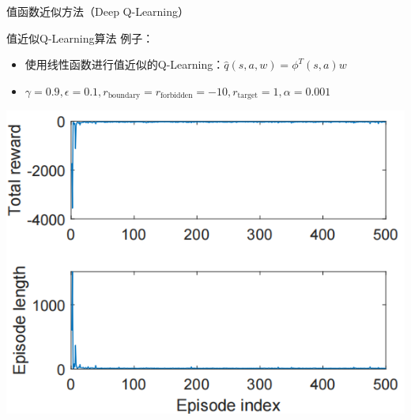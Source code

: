 \begin{section}{值函数近似方法\alert{（Deep Q-Learning）}}
\begin{frame}{值近似Q-Learning算法}
    例子：
    \begin{itemize}
        \item 使用\alert{线性函数}进行值近似的Q-Learning：$\hat{q}(s,a,w)=\phi^T(s,a)w$
        \item $\gamma=0.9,\epsilon=0.1,r_\text{boundary}=r_\text{forbidden}=-10, r_\text{target}=1,\alpha=0.001$
    \end{itemize}
    \begin{center}
        \begin{minipage}{0.3\textwidth}
            \centering
            \includegraphics[width=\linewidth]{assets/valueqlearningepisode.png}
        \end{minipage}
        \hspace{1cm}
        \begin{minipage}{0.3\textwidth}
            \centering

\end{minipage}
\end{center}
\end{frame}
\end{section}
